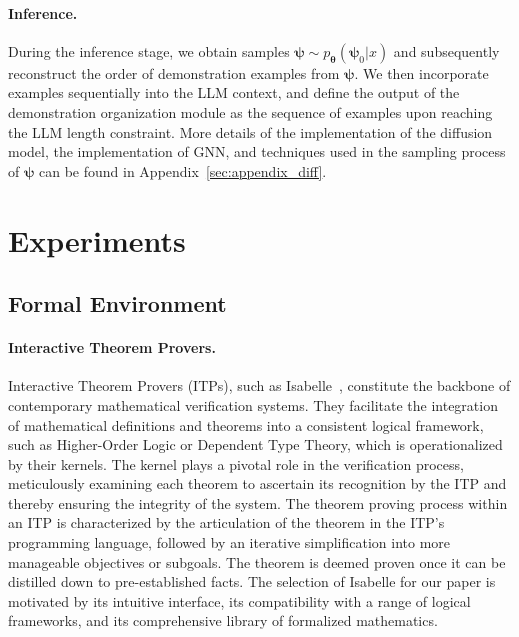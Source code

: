 \documentclass{article}
\begin{document}
\paragraph{Inference.}
During the inference stage, we obtain samples $\boldsymbol{\psi} \sim p_{\boldsymbol{\theta}}(\boldsymbol{\psi}_0 | x)$ and subsequently reconstruct the order of demonstration examples from $\boldsymbol{\psi}$. We then incorporate examples sequentially into the LLM context, and define the output of the demonstration organization module as the sequence of examples upon reaching the LLM length constraint.
More details of the implementation of the diffusion model, the implementation of GNN, and techniques used in the sampling process of $\boldsymbol{\psi}$ can be found in Appendix~\ref{sec:appendix_diff}.


\section{Experiments}
\label{sec:experiment}
\subsection{Formal Environment}
\paragraph{Interactive Theorem Provers.}
Interactive Theorem Provers (ITPs), such as Isabelle~\cite{paulson1994isabelle}, constitute the backbone of contemporary mathematical verification systems. They facilitate the integration of mathematical definitions and theorems into a consistent logical framework, such as Higher-Order Logic or Dependent Type Theory, which is operationalized by their kernels. The kernel plays a pivotal role in the verification process, meticulously examining each theorem to ascertain its recognition by the ITP and thereby ensuring the integrity of the system. The theorem proving process within an ITP is characterized by the articulation of the theorem in the ITP's programming language, followed by an iterative simplification into more manageable objectives or subgoals. The theorem is deemed proven once it can be distilled down to pre-established facts. The selection of Isabelle for our paper is motivated by its intuitive interface, its compatibility with a range of logical frameworks, and its comprehensive library of formalized mathematics.
\end{document}
